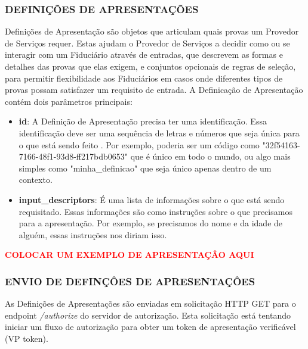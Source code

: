 \subsubsection{DEFINIÇÕES DE APRESENTAÇÕES}

Definições de Apresentação são objetos que articulam quais provas um Provedor de Serviços requer. Estas ajudam o Provedor de Serviços a decidir como ou se interagir com um Fiduciário através de entradas, que descrevem as formas e detalhes das provas que elas exigem, e conjuntos opcionais de regras de seleção, para permitir flexibilidade aos Fiduciários em casos onde diferentes tipos de provas possam satisfazer um requisito de entrada. A Definicação de Apresentação contém dois parâmetros principais:

\begin{itemize}

    \item \textbf{id}: A Definição de Apresentação precisa ter uma identificação. Essa identificação
    deve ser uma sequência de letras e números que seja única para o que está sendo feito . Por exemplo, poderia ser um código como "32f54163-7166-48f1-93d8-ff217bdb0653" que é único em todo o mundo, ou algo mais simples como "minha\_definicao" que seja único apenas dentro de um contexto.

    \item \textbf{input\_descriptors}: É uma lista de informações sobre o que está sendo requisitado. Essas informações são como instruções sobre o que precisamos para a apresentação. Por exemplo, se precisamos do nome e da idade de alguém, essas instruções nos diriam isso.

\end{itemize}

\textbf{\textcolor{red}{COLOCAR UM EXEMPLO DE APRESENTAÇÂO AQUI}}

\subsubsection{ENVIO DE DEFINÇÔES DE APRESENTAÇÔES}

As Definições de Apresentações são enviadas em solicitação HTTP GET para o endpoint\textit{ /authorize} do servidor de autorização. Esta solicitação está tentando iniciar um fluxo de autorização para obter um token de apresentação verificável (VP token).

